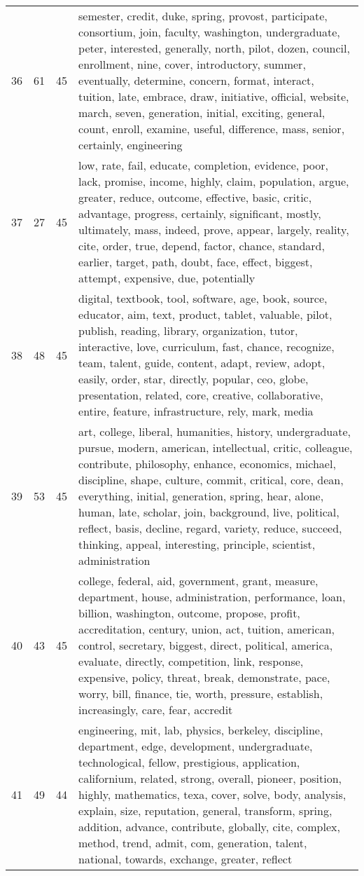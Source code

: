 \begin{table}[ht]
{\begin{tabularx}{\textwidth}{llrX}
   36 & 61 & 45 & semester, credit, duke, spring, provost, participate, consortium, join, faculty, washington, undergraduate, peter, interested, generally, north, pilot, dozen, council, enrollment, nine, cover, introductory, summer, eventually, determine, concern, format, interact, tuition, late, embrace, draw, initiative, official, website, march, seven, generation, initial, exciting, general, count, enroll, examine, useful, difference, mass, senior, certainly, engineering \\ 
   37 & 27 & 45 & low, rate, fail, educate, completion, evidence, poor, lack, promise, income, highly, claim, population, argue, greater, reduce, outcome, effective, basic, critic, advantage, progress, certainly, significant, mostly, ultimately, mass, indeed, prove, appear, largely, reality, cite, order, true, depend, factor, chance, standard, earlier, target, path, doubt, face, effect, biggest, attempt, expensive, due, potentially \\ 
   38 & 48 & 45 & digital, textbook, tool, software, age, book, source, educator, aim, text, product, tablet, valuable, pilot, publish, reading, library, organization, tutor, interactive, love, curriculum, fast, chance, recognize, team, talent, guide, content, adapt, review, adopt, easily, order, star, directly, popular, ceo, globe, presentation, related, core, creative, collaborative, entire, feature, infrastructure, rely, mark, media \\ 
   39 & 53 & 45 & art, college, liberal, humanities, history, undergraduate, pursue, modern, american, intellectual, critic, colleague, contribute, philosophy, enhance, economics, michael, discipline, shape, culture, commit, critical, core, dean, everything, initial, generation, spring, hear, alone, human, late, scholar, join, background, live, political, reflect, basis, decline, regard, variety, reduce, succeed, thinking, appeal, interesting, principle, scientist, administration \\ 
   40 & 43 & 45 & college, federal, aid, government, grant, measure, department, house, administration, performance, loan, billion, washington, outcome, propose, profit, accreditation, century, union, act, tuition, american, control, secretary, biggest, direct, political, america, evaluate, directly, competition, link, response, expensive, policy, threat, break, demonstrate, pace, worry, bill, finance, tie, worth, pressure, establish, increasingly, care, fear, accredit \\ 
   41 & 49 & 44 & engineering, mit, lab, physics, berkeley, discipline, department, edge, development, undergraduate, technological, fellow, prestigious, application, californium, related, strong, overall, pioneer, position, highly, mathematics, texa, cover, solve, body, analysis, explain, size, reputation, general, transform, spring, addition, advance, contribute, globally, cite, complex, method, trend, admit, com, generation, talent, national, towards, exchange, greater, reflect \\ 

\end{tabularx}}
\end{table}
